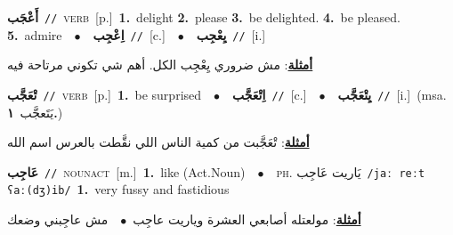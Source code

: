 \documentclass[10pt,a4paper,twoside]{article} %
\begin{document}
\begin{multicols}{2}
{\setlength\topsep{0pt}\textbf{\foreignlanguage{arabic}{أَعْجَب}}\ {\color{gray}\texttt{//}\color{black}}\ \textsc{verb}\ [p.]\ \textbf{1.}~delight  \textbf{2.}~please  \textbf{3.}~be delighted.  \textbf{4.}~be pleased.  \textbf{5.}~admire\ \ $\bullet$\ \ \setlength\topsep{0pt}\textbf{\foreignlanguage{arabic}{اِعْجِب}}\ {\color{gray}\texttt{//}\color{black}}\ [c.]\ \ $\bullet$\ \ \setlength\topsep{0pt}\textbf{\foreignlanguage{arabic}{يِعْجِب}}\ {\color{gray}\texttt{//}\color{black}}\ [i.]\  \begin{flushright}\color{gray}\foreignlanguage{arabic}{\textbf{\underline{\foreignlanguage{arabic}{أمثلة}}}: مش ضروري يِعْجِب الكل. أهم شي تكوني مرتاحة فيه}\end{flushright}\color{black}} \vspace{2mm}

{\setlength\topsep{0pt}\textbf{\foreignlanguage{arabic}{تْعَجَّب}}\ {\color{gray}\texttt{//}\color{black}}\ \textsc{verb}\ [p.]\ \textbf{1.}~be surprised\ \ $\bullet$\ \ \setlength\topsep{0pt}\textbf{\foreignlanguage{arabic}{اِتْعَجَّب}}\ {\color{gray}\texttt{//}\color{black}}\ [c.]\ \ $\bullet$\ \ \setlength\topsep{0pt}\textbf{\foreignlanguage{arabic}{يِتْعَجَّب}}\ {\color{gray}\texttt{//}\color{black}}\ [i.]\ \color{gray}(msa. \foreignlanguage{arabic}{يَتَعجَّب}~\foreignlanguage{arabic}{\textbf{١.}})\color{black}\  \begin{flushright}\color{gray}\foreignlanguage{arabic}{\textbf{\underline{\foreignlanguage{arabic}{أمثلة}}}: تْعَجَّبت من كمية الناس اللي نقَّطت بالعرس اسم الله}\end{flushright}\color{black}} \vspace{2mm}

{\setlength\topsep{0pt}\textbf{\foreignlanguage{arabic}{عَاجِب}}\ {\color{gray}\texttt{//}\color{black}}\ \textsc{noun\textunderscore act}\ [m.]\ \textbf{1.}~like (Act.Noun)\ \ $\bullet$\ \ \textsc{ph.} \color{gray} \foreignlanguage{arabic}{يَاريت عَاجِب}\color{black}\ {\color{gray}\texttt{/{\sffamily jaː reːt ʕaː(dʒ)ib}/}\color{black}}\ \textbf{1.}~very fussy and fastidious\  \begin{flushright}\color{gray}\foreignlanguage{arabic}{\textbf{\underline{\foreignlanguage{arabic}{أمثلة}}}: مولعتله أصابعي العشرة  وياريت عاجِب\ $\bullet$\ \  مش عاجِبني وضعك}\end{flushright}\color{black}} \vspace{2mm}


\end{multicols}
\end{document}
